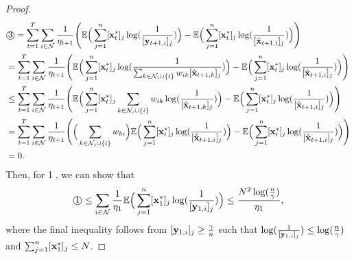 \begin{proof}
	\begin{equation*}
		\begin{aligned}
			&\text{\textcircled{3}}=\sum_{t=1}^{T}\sum_{i\in\mathcal{N}}\frac{1}{\eta_{t+1}}\Bigg(\mathbb{E}\Big(\sum_{j=1}^{n}[\mathbf{x}_{t}^{*}]_{j}\log(\frac{1}{[\mathbf{y}_{t+1,i}]_{j}})\Big)-\mathbb{E}\Big(\sum_{j=1}^{n}[\mathbf{x}_{t}^{*}]_{j}\log(\frac{1}{[\hat{\mathbf{x}}_{t+1,i}]_{j}})\Big)\Bigg)\\
			&=\sum_{t=1}^{T}\sum_{i\in\mathcal{N}}\frac{1}{\eta_{t+1}}\Bigg(\mathbb{E}\Big(\sum_{j=1}^{n}[\mathbf{x}_{t}^{*}]_{j}\log(\frac{1}{\sum_{k\in\mathcal{N}_{i}\cup\{i\}}w_{ik}[\hat{\mathbf{x}}_{t+1,k}]_{j}})\Big)-\mathbb{E}\Big(\sum_{j=1}^{n}[\mathbf{x}_{t}^{*}]_{j}\log(\frac{1}{[\hat{\mathbf{x}}_{t+1,i}]_{j}})\Big)\Bigg)\\
			&\le\sum_{t=1}^{T}\sum_{i\in\mathcal{N}}\frac{1}{\eta_{t+1}}\Bigg(\mathbb{E}\Big(\sum_{j=1}^{n}[\mathbf{x}_{t}^{*}]_{j}\sum_{k\in\mathcal{N}_{i}\cup\{i\}}w_{ik}\log(\frac{1}{[\hat{\mathbf{x}}_{t+1,k}]_{j}})\Big)-\mathbb{E}\Big(\sum_{j=1}^{n}[\mathbf{x}_{t}^{*}]_{j}\log(\frac{1}{[\hat{\mathbf{x}}_{t+1,i}]_{j}})\Big)\Bigg)\\
			&=\sum_{t=1}^{T}\sum_{i\in\mathcal{N}}\frac{1}{\eta_{t+1}}\Bigg(\Big(\sum_{k\in\mathcal{N}_{i}\cup\{i\}}w_{ki}\Big)\mathbb{E}\Big(\sum_{j=1}^{n}[\mathbf{x}_{t}^{*}]_{j}\log(\frac{1}{[\hat{\mathbf{x}}_{t+1,i}]_{j}})\Big)-\mathbb{E}\Big(\sum_{j=1}^{n}[\mathbf{x}_{t}^{*}]_{j}\log(\frac{1}{[\hat{\mathbf{x}}_{t+1,i}]_{j}})\Big)\Bigg)\\
			&=0.
		\end{aligned}
	\end{equation*}
	Then, for \textcircled{1}, we can show that
	\begin{equation*}
\text{\textcircled{1}}\le\sum_{i\in\mathcal{N}}\frac{1}{\eta_{1}}\mathbb{E}\Big(\sum_{j=1}^{n}[\mathbf{x}_{1}^{*}]_{j}\log(\frac{1}{[\mathbf{y}_{1,i}]_{j}})\Big)\le\frac{N^{2}\log(\frac{n}{\gamma})}{\eta_{1}},
	\end{equation*} where the final inequality follows from $[\mathbf{y}_{1,i}]_{j}\ge\frac{\gamma}{n}$ such that $\log(\frac{1}{[\mathbf{y}_{1,i}]_{j}})\le\log(\frac{n}{\gamma})$ and $\sum_{j=1}^{n}[\mathbf{x}_{1}^{*}]_{j}\le N$.
	

\end{proof}
